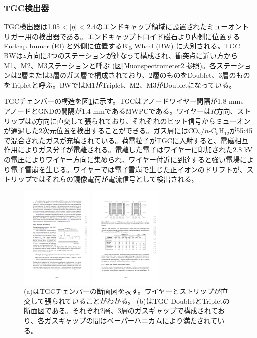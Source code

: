 \subsubsection*{TGC検出器}
TGC検出器は1.05 < |$\eta$| < 2.4のエンドキャップ領域に設置されたミューオントリガー用の検出器である。エンドキャップトロイド磁石より内側に位置するEndcap Innner  (EI) と外側に位置するBig Wheel  (BW) に大別される。TGC BWは$z$方向に3つのステーションが連なって構成され、衝突点に近い方からM1、M2、M3ステーションと呼ぶ (図\ref{Muonspectrometer2}参照)。各ステーションは2層または3層のガス層で構成されており、2層のものをDoublet、3層のものをTripletと呼ぶ。BWではM1がTriplet、M2、M3がDoubletになっている。

TGCチェンバーの構造を図\ref{TGC_structure}に示す。TGCはアノードワイヤー間隔が1.8 mm、アノードとGNDの間隔が1.4 mmであるMWPCである。ワイヤーは$R$方向、ストリップは$\phi$方向に直交して張られており、それぞれのヒット信号からミューオンが通過した2次元位置を検出することができる。ガス層には$\mathrm{CO_2}/n\text{-}\mathrm{C_5H_{12}}$が55:45で混合されたガスが充填されている。荷電粒子がTGCに入射すると、電磁相互作用によりガス分子が電離される。電離した電子はワイヤーに印加された2.8 kVの電圧によりワイヤー方向に集められ、ワイヤー付近に到達すると強い電場により電子雪崩を生じる。ワイヤーでは電子雪崩で生じた正イオンのドリフトが、ストリップではそれらの鏡像電荷が電流信号として検出される。

\begin{figure}
\begin{minipage}[b]{.4\linewidth}
\centering
\includegraphics[height=5cm]{fig/Intro/TGC_structure.pdf}
\end{minipage}%
\begin{minipage}[b]{.6\linewidth}
\centering
\includegraphics[height=5cm]{fig/Intro/TGC_crosssection.pdf}
\end{minipage}%
\caption[TGCチェンバーの断面図]{ (a)はTGCチェンバーの断面図を表す\cite{JINST:2008}。ワイヤーとストリップが直交して張られていることがわかる。 (b)はTGC DoubletとTripletの断面図である。それぞれ2層、3層のガスギャップで構成されており、各ガスギャップの間はペーパーハニカムにより満たされている。}
\label{TGC_structure}
\end{figure}

